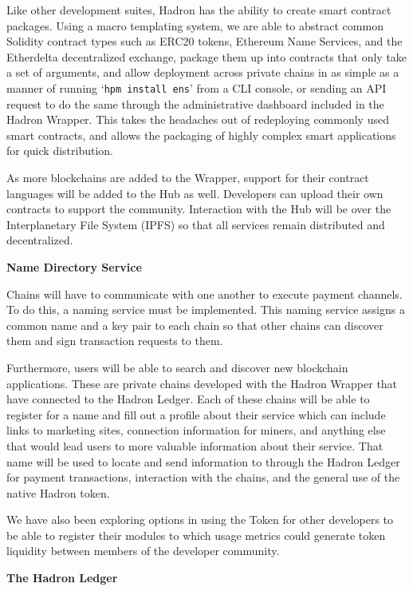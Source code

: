 \documentclass{%
	article}
\begin{document}
Like other development suites, Hadron has the ability to create smart contract packages. Using a macro templating system, we are able to abstract common Solidity contract types such as ERC20 tokens, Ethereum Name Services, and the Etherdelta decentralized exchange, package them up into contracts that only take a set of arguments, and allow deployment across private chains in as simple as a manner of running ‘\texttt{hpm install ens}’ from a CLI console, or sending an API request to do the same through the administrative dashboard included in the Hadron Wrapper. This takes the headaches out of redeploying commonly used smart contracts, and allows the packaging of highly complex smart applications for quick distribution.

As more blockchains are added to the Wrapper, support for their contract languages will be added to the Hub as well. Developers can upload their own contracts to support the community. Interaction with the Hub will be over the Interplanetary File System (IPFS) so that all services remain distributed and decentralized.

\begin{center}
\textbf{Name Directory Service}
\end{center}

Chains will have to communicate with one another to execute payment channels. To do this, a naming service must be implemented. This naming service assigns a common name and a key pair to each chain so that other chains can discover them and sign transaction requests to them.

Furthermore, users will be able to search and discover new blockchain applications. These are private chains developed with the Hadron Wrapper that have connected to the Hadron Ledger. Each of these chains will be able to register for a name and fill out a profile about their service which can include links to marketing sites, connection information for miners, and anything else that would lead users to more valuable information about their service. That name will be used to locate and send information to through the Hadron Ledger for payment transactions, interaction with the chains, and the general use of the native Hadron token.

We have also been exploring options in using the Token for other developers to be able to register their modules to which usage metrics could generate token liquidity between members of the developer community.

\begin{center}
\textbf{The Hadron Ledger}
\end{center}
\end{document}
